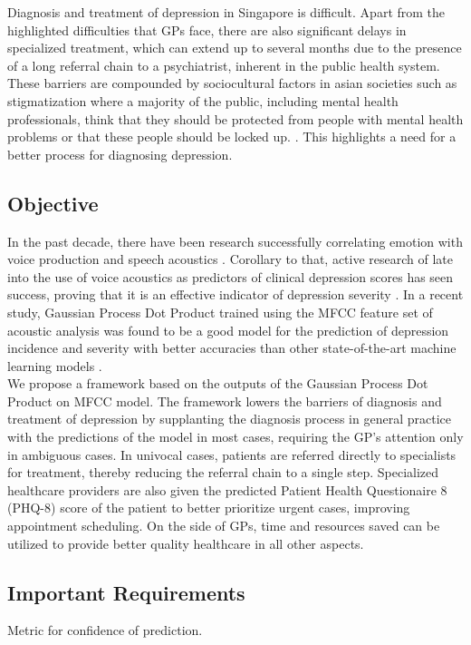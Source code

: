 \documentclass{article}
\begin{document}
	Diagnosis and treatment of depression in Singapore is difficult. Apart from the highlighted difficulties that GPs face, there are also significant delays in specialized treatment, which can extend up to several months due to the presence of a long referral chain to a psychiatrist, inherent in the public health system. These barriers are compounded by sociocultural factors in asian societies such as stigmatization where a majority of the public, including mental health professionals, think that they should be protected from people with mental health problems or that these people should be locked up. \cite{chong2009}. This highlights a need for a better process for diagnosing depression. \\
	
	\subsection{Objective}
	In the past decade, there have been research successfully correlating emotion with voice production and speech acoustics \cite{uwa2001}. 
	Corollary to that, active research of late into the use of voice acoustics as predictors of clinical depression scores has seen success, proving that it is an effective indicator of depression severity \cite{jov2016}. In a recent study, Gaussian Process Dot Product trained using the MFCC feature set of acoustic analysis was found to be a good model for the prediction of depression incidence and severity with better accuracies than other state-of-the-art machine learning models \cite{cs42462016}. \\

	We propose a framework based on the outputs of the Gaussian Process Dot Product on MFCC model. The framework lowers the barriers of diagnosis and treatment of depression by supplanting the diagnosis process in general practice with the predictions of the model in most cases, requiring the GP's attention only in ambiguous cases. In univocal cases, patients are referred directly to specialists for treatment, thereby reducing the referral chain to a single step. Specialized healthcare providers are also given the predicted Patient Health Questionaire 8 (PHQ-8) score of the patient to better prioritize urgent cases, improving appointment scheduling. On the side of GPs, time and resources saved can be utilized to provide better quality healthcare in all other aspects.
	
	\subsection{Important Requirements}
	Metric for confidence of prediction. 
	
\end{document}
